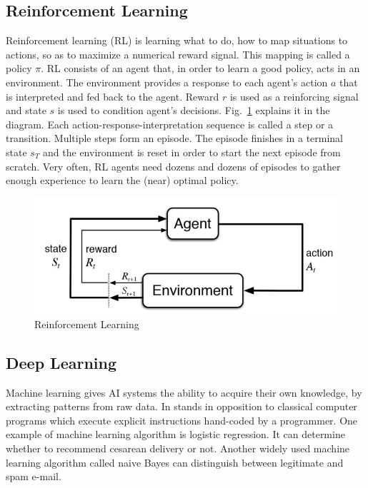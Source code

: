 \subsection{Reinforcement Learning}

Reinforcement learning (RL) is learning what to do, how to map situations to actions, so as to maximize a numerical reward signal.\cite{Book.RLAI} This mapping is called a policy $\pi$. RL consists of an agent that, in order to learn a good policy, acts in an environment. The environment provides a response to each agent's action $a$ that is interpreted and fed back to the agent. Reward $r$ is used as a reinforcing signal and state $s$ is used to condition agent's decisions. Fig.~\ref{Fig.RL} explains it in the diagram.
Each action-response-interpretation sequence is called a step or a transition. Multiple steps form an episode. The episode finishes in a terminal state $s_T$ and the environment is reset in order to start the next episode from scratch. Very often, RL agents need dozens and dozens of episodes to gather enough experience to learn the (near) optimal policy.

\begin{figure}[H]
\includegraphics[]{figures/RL.jpg}
\caption[Reinforcement Learning]{Reinforcement Learning\protect\cite{Book.RLAI}}
\label{Fig.RL}
\end{figure}


\subsection{Deep Learning}

Machine learning gives AI systems the ability to acquire their own knowledge, by extracting patterns from raw data. In stands in opposition to classical computer programs which execute explicit instructions hand-coded by a programmer.
One example of machine learning algorithm is logistic regression. It can determine whether to recommend cesarean delivery or not\cite{Study.Cesarean}. Another widely used machine learning algorithm called naive Bayes can distinguish between legitimate and spam e-mail.


